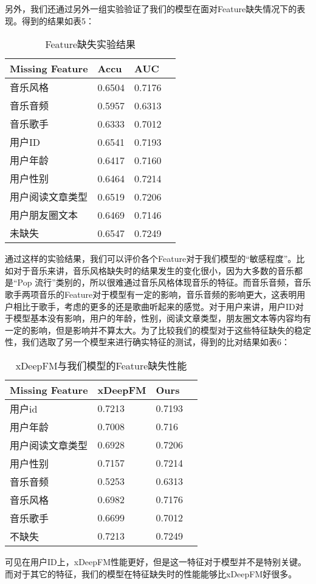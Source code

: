 另外，我们还通过另外一组实验验证了我们的模型在面对Feature缺失情况下的表现。得到的结果如表5：
\begin{table}
\centering
\caption{Feature缺失实验结果}
\begin{tabular}{|l|l|l|l|}
\hline

Missing Feature & Accu & AUC \\ \hline
音乐风格 & 0.6504 & 0.7176 \\ \hline
音乐音频 & 0.5957 & 0.6313 \\ \hline
音乐歌手 & 0.6333 & 0.7012 \\ \hline
用户ID & 0.6541 & 0.7193 \\ \hline
用户年龄 & 0.6417 & 0.7160 \\ \hline
用户性别 & 0.6464 & 0.7214 \\ \hline
用户阅读文章类型 & 0.6519 & 0.7206 \\ \hline
用户朋友圈文本 & 0.6469 & 0.7146 \\ \hline
未缺失 & 0.6547 & 0.7249 \\ \hline

\end{tabular}
\end{table}

通过这样的实验结果，我们可以评价各个Feature对于我们模型的“敏感程度”。比如对于音乐来讲，音乐风格缺失时的结果发生的变化很小，因为大多数的音乐都是“Pop 流行”类别的，所以很难通过音乐风格体现音乐的特征。而音乐音频，音乐歌手两项音乐的Feature对于模型有一定的影响，音乐音频的影响更大，这表明用户相比于歌手，考虑的更多的还是歌曲听起来的感觉。对于用户来讲，用户ID对于模型基本没有影响，用户的年龄，性别，阅读文章类型，朋友圈文本等内容均有一定的影响，但是影响并不算太大。为了比较我们的模型对于这些特征缺失的稳定性，我们选取了另一个模型来进行确实特征的测试，得到的比对结果如表6：

\begin{table}
\centering
\caption{xDeepFM与我们模型的Feature缺失性能}
\begin{tabular}{|l|l|l|l|}
\hline

Missing Feature & xDeepFM & Ours \\ \hline
用户id & 0.7213 & 0.7193 \\ \hline
用户年龄 & 0.7008 & 0.716 \\ \hline
用户阅读文章类型 & 0.6928 & 0.7206 \\ \hline
用户性别 & 0.7157 & 0.7214 \\ \hline
音乐音频 & 0.5253 & 0.6313 \\ \hline
音乐风格 & 0.6982 & 0.7176 \\ \hline
音乐歌手 & 0.6699 & 0.7012 \\ \hline
不缺失 & 0.7213 & 0.7249 \\ \hline

\end{tabular}
\end{table}

可见在用户ID上，xDeepFM性能更好，但是这一特征对于模型并不是特别关键。而对于其它的特征，我们的模型在特征缺失时的性能能够比xDeepFM好很多。